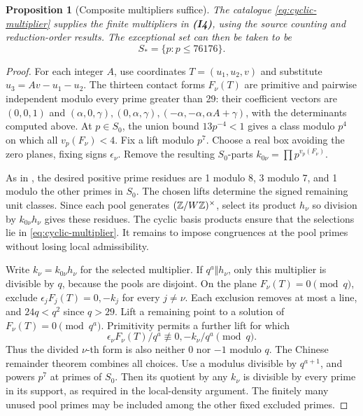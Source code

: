 \documentclass[11pt]{article}
\newtheorem{proposition}[theorem]{Proposition}
\theoremstyle{definition}
\begin{document}
\begin{proposition}[Composite multipliers suffice]
The catalogue \eqref{eq:cyclic-multiplier} supplies the finite multipliers
in \textbf{(I4)}, using the source counting and reduction-order results. The exceptional
set can then be taken to be
\begin{equation}\label{eq:small-S}
                         S_* =\{p:p\le76176\}.
\end{equation}
\end{proposition}
\begin{proof}
For each integer \(A\), use coordinates \(T=(u_1,u_2,v)\)
and substitute \(u_3=Av-u_1-u_2\). The thirteen contact forms
\(F_\nu(T)\) are primitive and pairwise independent modulo every
prime greater than 29: their coefficient vectors are \((0,0,1)\)
and \((\alpha,0,\gamma),(0,\alpha,\gamma),
(-\alpha,-\alpha,\alpha A+\gamma)\), with the determinants
computed above. At \(p\in S_0\), the union bound
\(13p^{-4}<1\) gives a class modulo \(p^4\) on which all
\(v_p(F_\nu)<4\). Fix a lift modulo \(p^7\).
Choose a real box avoiding the zero planes, fixing signs
\(\epsilon_\nu\). Remove the resulting \(S_0\)-parts
\(k_{0\nu}=\prod p^{v_p(F_\nu)}\).

As in \cite[Section 6.2]{H10}, the desired positive prime residues
are 1 modulo 8, 3 modulo 7, and 1 modulo the other primes in \(S_0\).
The chosen lifts determine the signed remaining unit classes. Since each
pool generates \((\mathbb Z/W\mathbb Z)^\times\), select its product \(h_\nu\)
so division by \(k_{0\nu}h_\nu\) gives these residues. The cyclic basis products ensure that the selections lie in
\eqref{eq:cyclic-multiplier}. It remains to impose congruences at the
pool primes without losing local admissibility.

Write \(k_\nu=k_{0\nu}h_\nu\) for the selected multiplier.
If \(q^a\Vert h_\nu\), only this multiplier is divisible by
\(q\), because the pools are disjoint. On the plane
\(F_\nu(T)=0\pmod q\), exclude
\(\epsilon_jF_j(T)=0,-k_j\) for every \(j\ne\nu\).
Each exclusion removes at most a line, and \(24q<q^2\) since
\(q>29\). Lift a remaining point to a solution of
\(F_\nu(T)=0\pmod{q^a}\). Primitivity permits a further lift
for which
\[
       \epsilon_\nu F_\nu(T)/q^a
                   \not\equiv0,-k_\nu/q^a\pmod q.
\]
Thus the divided \(\nu\)-th form is also neither 0 nor \(-1\)
modulo \(q\). The Chinese remainder theorem combines all choices.
Use a modulus divisible by \(q^{a+1}\), and powers \(p^7\)
at primes of \(S_0\). Then its quotient by any \(k_\nu\)
is divisible by every prime in its support, as required in the
local-density argument. The finitely many unused pool primes may be
included among the other fixed excluded primes.


\end{proof}
\end{document}
